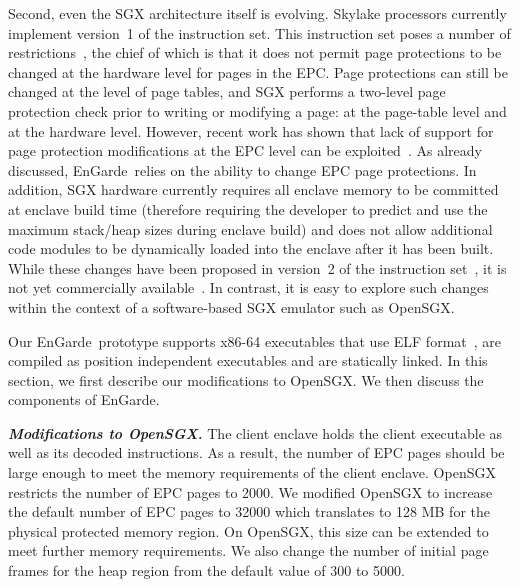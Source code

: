 \documentclass[conference,compsoc]{IEEEtran}
\newcommand{\myparagraph}[1]{\parskip -4pt \indent\par\noindent\textbf{\textit{#1}} \parskip 0pt}
\newcommand{\tool}{EnGarde\xspace} %
\begin{document}
Second, even the SGX architecture itself is evolving. Skylake processors
currently implement version~1 of the instruction set. This instruction set
poses a number of restrictions~\cite{dynmgmt:hasp16,dynalloc:hasp16}, the chief
of which is that it does not permit page protections to be changed at the
hardware level for pages in the EPC. Page protections can still be changed at
the level of page tables, and SGX performs a two-level page protection check
prior to writing or modifying a page: at the page-table level and at the
hardware level. However, recent work has shown that lack of support for page
protection modifications at the EPC level can be
exploited~\cite{asyncshock:esorics16}. As already discussed, \tool\ relies on
the ability to change EPC page protections. In addition, SGX hardware currently
requires all enclave memory to be committed at enclave build time (therefore
requiring the developer to predict and use the maximum stack/heap sizes during
enclave build) and does not allow additional code modules to be dynamically
loaded into the enclave after it has been built.  While these changes have been
proposed in version~2 of the instruction
set~\cite{dynmgmt:hasp16,dynalloc:hasp16}, it is not yet commercially
available~\cite{sgx:v2:na}. In contrast, it is easy to explore such changes
within the context of a software-based SGX emulator such as OpenSGX.





Our \tool\ prototype supports x86-64 executables that use ELF
format~\cite{elfsharedlib, elfsystemV}, are compiled as position independent
executables and are statically linked.  In this section, we first describe our
modifications to OpenSGX. We then discuss the components of \tool.

\myparagraph{Modifications to OpenSGX.} The client enclave holds the client
executable as well as its decoded instructions. As a result, the number of EPC
pages should be large enough to meet the memory requirements of the client
enclave. OpenSGX restricts the number of EPC pages to 2000. We modified OpenSGX
to increase the default number of EPC pages to 32000 which translates to 128 MB
for the physical protected memory region. On OpenSGX, this size can be extended
to meet further memory requirements. We also change the number of initial page
frames for the heap region from the default value of 300 to 5000.
\end{document}

